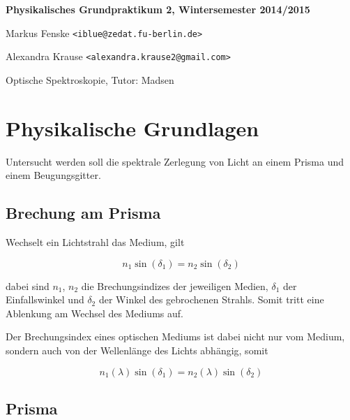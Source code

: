 \documentclass[a4paper,german,12pt,smallheadings]{scrartcl}
\begin{document}
\begin{titlepage}

\end{titlepage}

\allowdisplaybreaks %
\begin{center}
\bfseries %
\sffamily %
\vspace{-40pt}
Physikalisches Grundpraktikum 2, Wintersemester 2014/2015

Markus Fenske \texttt{<iblue@zedat.fu-berlin.de>}

Alexandra Krause \texttt{<alexandra.krause2@gmail.com>}

Optische Spektroskopie, Tutor: Madsen
\vspace{-10pt}
\end{center}

\section{Physikalische Grundlagen}

Untersucht werden soll die spektrale Zerlegung von Licht an einem Prisma und
einem Beugungsgitter.

\subsection{Brechung am Prisma}

Wechselt ein Lichtstrahl das Medium, gilt

\begin{equation}
  n_1 \sin(\delta_1) = n_2 \sin(\delta_2)
\end{equation}

dabei sind $n_1$, $n_2$ die Brechungsindizes der jeweiligen Medien, $\delta_1$
der Einfallswinkel und $\delta_2$ der Winkel des gebrochenen Strahls. Somit
tritt eine Ablenkung am Wechsel des Mediums auf.

Der Brechungsindex eines optischen Mediums ist dabei nicht nur vom Medium,
sondern auch von der Wellenlänge des Lichts abhängig, somit

\begin{equation}
  n_1(\lambda) \sin(\delta_1) = n_2(\lambda) \sin(\delta_2)
\end{equation}

\subsection{Prisma}
\end{document}
